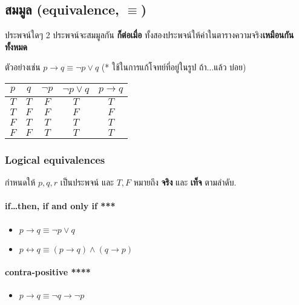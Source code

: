 \documentclass[12pt,a4paper]{article}
\begin{document}
\subsection*{สมมูล (equivalence, $\equiv$)}
\quad ประพจน์ใดๆ 2 ประพจน์จะสมมูลกัน \textbf{ก็ต่อเมื่อ} ทั้งสองประพจน์ให้ค่าในตารางความจริง\textbf{เหมือนกันทั้งหมด} \\
\rule{0pt}{4ex}
ตัวอย่างเช่น $p\rightarrow q \equiv \neg p \lor q$ (* ใช้ในการแก้โจทย์ที่อยู่ในรูป ถ้า$\ldots$แล้ว บ่อย)
\begin{center}
    \begin{tabular}{|c|c||c||c|c|}
        \hline
        $p$ & $q$ & $\neg p$ & $\neg p \lor q$ & $p \rightarrow q$ \\
        \hline
        $T$ & $T$ & $F$      & $T$             & $T$               \\
        \hline
        $T$ & $F$ & $F$      & $F$             & $F$               \\
        \hline
        $F$ & $T$ & $T$      & $T$             & $T$               \\
        \hline
        $F$ & $F$ & $T$      & $T$             & $T$               \\
        \hline
    \end{tabular}
\end{center}

\subsubsection*{Logical equivalences}
\quad กำหนดให้ $p,q,r$ เป็นประพจน์ และ $T, F$ หมายถึง \textbf{จริง} และ \textbf{เท็จ} ตามลำดับ. \\
\paragraph{if\ldots then, if and only if ***}
\begin{itemize}
    \item $p \rightarrow q \equiv \neg p \lor q$
    \item $p \leftrightarrow q \equiv (p \rightarrow q) \land (q \rightarrow p)$
\end{itemize}
\paragraph{contra-positive ****}
\begin{itemize}
    \item $p \rightarrow q \equiv \neg q \rightarrow \neg p$
\end{itemize}
\end{document}
